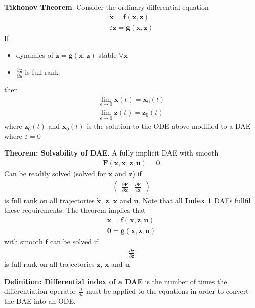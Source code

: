 \textbf{Tikhonov Theorem}. Consider the ordinary differential equation
\begin{align*}
    \dot{\bm{x}} = \bm{f}(\bm{x},\bm{z}) \\
    \varepsilon \dot{\bm{z}} = \bm{g}(\bm{x},\bm{z})
\end{align*}
If \begin{itemize}
    \item dynamics of \(\dot{\bm{z}} = \bm{g}(\bm{x},\bm{z})\) stable \(\forall \bm{x}\)
    \item \(\frac{\partial \bm{g}}{\partial \bm{z}}\) is full rank
\end{itemize}
then
\begin{align*}
    \lim_{\epsilon \rightarrow 0} \bm{x}(t) = \bm{x}_0(t) \\
    \lim_{\epsilon \rightarrow 0} \bm{z}(t) = \bm{z}_0(t)
\end{align*}
where \(\bm{z}_0(t)\) and \(\bm{x}_0(t)\) is the solution to the ODE above modified to a DAE where \(\varepsilon = 0\)
\newline

\textbf{Theorem: Solvability of DAE}. A fully implicit DAE with smooth
\begin{align*}
    \bm{F}(\dot{\bm{x}},\bm{x},\bm{z},\bm{u}) = \bm{0}
\end{align*}
Can be readily solved (solved for \(\dot{\bm{x}}\) and \(\bm{z}\)) if
\begin{align*}
    \begin{pmatrix}\frac{\partial \bm{F}}{\partial \dot{\bm{x}}} & \frac{\partial \bm{F}}{\partial \bm{z}} \end{pmatrix}
\end{align*}
is full rank on all trajectories \(\dot{\bm{x}}\), \(\bm{z}\), \(\bm{x}\) and \(\bm{u}\). Note that all \textbf{Index 1} DAEs fullfil these requirements. The theorem implies that
\begin{align*}
    \dot{\bm{x}} = \bm{f}(\bm{x},\bm{z},\bm{u}) \\
    \bm{0} = \bm{g}(\bm{x},\bm{z},\bm{u})
\end{align*}
with smooth \(\bm{f}\) can be solved if
\begin{align*}
    \frac{\partial \bm{g}}{\partial \bm{z}}
\end{align*}
is full rank on all trajectories \(\bm{z}\), \(\bm{x}\) and \(\bm{u}\)
\newline

\textbf{Definition: Differential index of a DAE} is the number of times the differentiation operator \(\frac{d}{dt}\)
must be applied to the equations in order to convert the DAE into an ODE.
